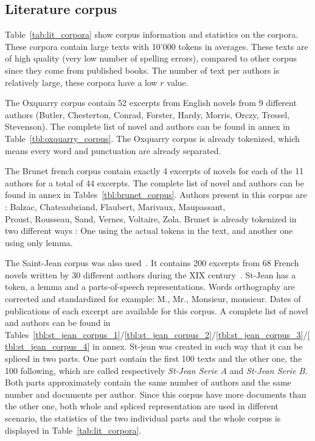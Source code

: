 \subsection{Literature corpus \label{sec:lit_corpus}}

Table~\ref{tab:lit_corpora} show corpus information and statistics on the corpora.
These corpora contain large texts with 10'000 tokens in averages.
These texts are of high quality (very low number of spelling errors), compared to other corpus since they come from published books.
The number of text per authors is relatively large, these corpora have a low $r$ value.

The Oxquarry corpus contain 52 excerpts from English novels from 9 different authors (Butler, Chesterton, Conrad, Forster, Hardy, Morris, Orczy, Tressel, Stevenson).
The complete list of novel and authors can be found in annex in Table~\ref{tbl:oxquarry_corpus}.
The Oxquarry corpus is already tokenized, which means every word and punctuation are already separated.

The Brunet french corpus contain exactly 4 excerpts of novels for each of the 11 authors for a total of 44 excerpts.
The complete list of novel and authors can be found in annex in Tables~\ref{tbl:brunet_corpus}.
Authors present in this corpus are : Balzac, Chateaubriand, Flaubert, Marivaux, Maupassant, \\
Proust, Rousseau, Sand, Vernes, Voltaire, Zola.
Brunet is already tokenized in two different ways : One using the actual tokens in the text, and another one using only lemma.

The Saint-Jean corpus was also used~\cite{unine_corpus}.
It contains 200 excerpts from 68 French novels written by 30 different authors during the XIX century~\cite{st_jean}.
St-Jean has a token, a lemma and a parts-of-speech representations.
Words orthography are corrected and standardized for example: M., Mr., Monsieur, monsieur.
Dates of publications of each excerpt are available for this corpus.
A complete list of novel and authors can be found in Tables~\ref{tbl:st_jean_corpus_1}/\ref{tbl:st_jean_corpus_2}/\ref{tbl:st_jean_corpus_3}/\ref{tbl:st_jean_corpus_4} in annex.
St-jean was created in such way that it can be spliced in two parts.
One part contain the first 100 texts and the other one, the 100 following, which are called respectively \textit{St-Jean Serie A} and \textit{St-Jean Serie B}.
Both parts approximately contain the same number of authors and the same number and documents per author.
Since this corpus have more documents than the other one, both whole and spliced representation are used in different scenario, the statistics of the two individual parts and the whole corpus is displayed in Table~\ref{tab:lit_corpora}.

